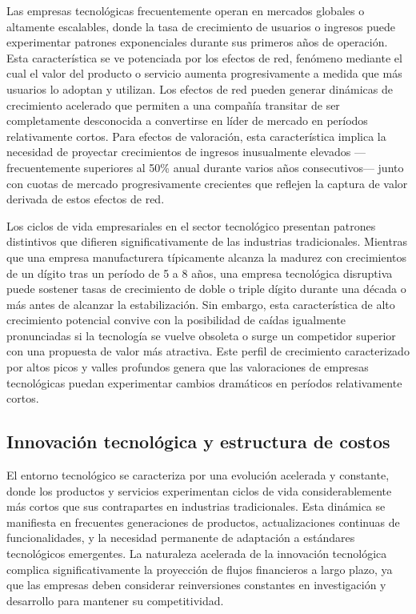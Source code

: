 Las empresas tecnológicas frecuentemente operan en mercados globales o altamente escalables, donde la tasa de crecimiento de usuarios o ingresos puede experimentar patrones exponenciales durante sus primeros años de operación. Esta característica se ve potenciada por los efectos de red, fenómeno mediante el cual el valor del producto o servicio aumenta progresivamente a medida que más usuarios lo adoptan y utilizan. Los efectos de red pueden generar dinámicas de crecimiento acelerado que permiten a una compañía transitar de ser completamente desconocida a convertirse en líder de mercado en períodos relativamente cortos. Para efectos de valoración, esta característica implica la necesidad de proyectar crecimientos de ingresos inusualmente elevados ---frecuentemente superiores al 50\% anual durante varios años consecutivos--- junto con cuotas de mercado progresivamente crecientes que reflejen la captura de valor derivada de estos efectos de red.

Los ciclos de vida empresariales en el sector tecnológico presentan patrones distintivos que difieren significativamente de las industrias tradicionales. Mientras que una empresa manufacturera típicamente alcanza la madurez con crecimientos de un dígito tras un período de 5 a 8 años, una empresa tecnológica disruptiva puede sostener tasas de crecimiento de doble o triple dígito durante una década o más antes de alcanzar la estabilización. Sin embargo, esta característica de alto crecimiento potencial convive con la posibilidad de caídas igualmente pronunciadas si la tecnología se vuelve obsoleta o surge un competidor superior con una propuesta de valor más atractiva. Este perfil de crecimiento caracterizado por altos picos y valles profundos genera que las valoraciones de empresas tecnológicas puedan experimentar cambios dramáticos en períodos relativamente cortos.

\subsection{Innovación tecnológica y estructura de costos}

El entorno tecnológico se caracteriza por una evolución acelerada y constante, donde los productos y servicios experimentan ciclos de vida considerablemente más cortos que sus contrapartes en industrias tradicionales. Esta dinámica se manifiesta en frecuentes generaciones de productos, actualizaciones continuas de funcionalidades, y la necesidad permanente de adaptación a estándares tecnológicos emergentes. La naturaleza acelerada de la innovación tecnológica complica significativamente la proyección de flujos financieros a largo plazo, ya que las empresas deben considerar reinversiones constantes en investigación y desarrollo para mantener su competitividad.

